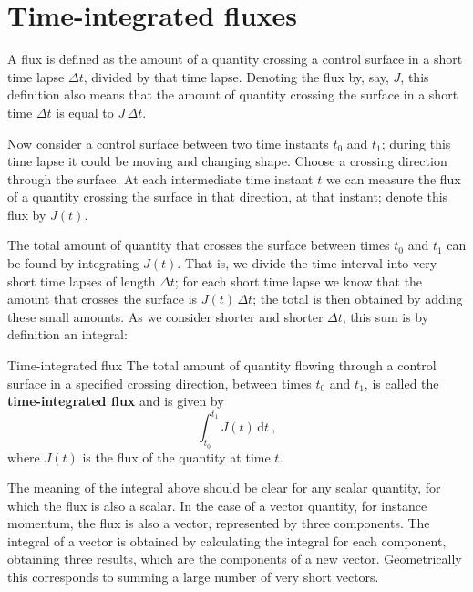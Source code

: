 \documentclass[a4paper,12pt,%
onecolumn,oneside,%
british%
]{memoir}
\newcommand*{\di}{\mathrm{d}}%
\newcommand*{\incr}{\Delta}%
\renewcommand*{\|}[1][]{\nonscript\:#1\vert\nonscript\:\mathopen{}}
\newcommand*{\yti}{t_{0}}
\newcommand*{\ytf}{t_{1}}
\newcommand*{\dt}{\di t}
\newcommand*{\Dt}{\incr t}
\newcommand*{\yJ}{J}
\begin{document}
%
%


\section{Time-integrated fluxes}
\label{sec:total_flow}

A flux is defined as the amount of a quantity crossing a control surface in a short time lapse $\Dt$, divided by that time lapse. Denoting the flux by, say, $\yJ$, this definition also means that the amount of quantity crossing the surface in a short time $\Dt$ is equal to $\yJ\,\Dt$.

Now consider a control surface between two time instants $\yti$ and $\ytf$; during this time lapse it could be moving and changing shape. Choose a crossing direction through the surface. At each intermediate time instant $t$ we can measure the flux of a quantity crossing the surface in that direction, at that instant; denote this flux by $\yJ(t)$.

The total amount of quantity that crosses the surface between times $\yti$ and $\ytf$ can be found by integrating $\yJ(t)$. That is, we divide the time interval into very short time lapses of length $\Dt$; for each short time lapse we know that the amount that crosses the surface is $\yJ(t)\,\Dt$; the total is then obtained by adding these small amounts. As we consider shorter and shorter $\Dt$, this sum is by definition an integral:
\begin{definition}{Time-integrated flux}
The total amount of quantity flowing through a control surface in a specified crossing direction, between times $\yti$ and $\ytf$, is called the \textbf{time-integrated flux} and is given by
  \begin{equation}
    \label{eq:total_flow_integral}
     \int_{\yti}^{\ytf}\!\! \yJ(t)\,\dt\ ,
   \end{equation}
   where $\yJ(t)$ is the flux of the quantity at time $t$.
\end{definition}

The meaning of the integral above should be clear for any scalar quantity, for which the flux is also a scalar. In the case of a vector quantity, for instance momentum, the flux is also a vector, represented by three components. The integral of a vector is obtained by calculating the integral for each component, obtaining three results, which are the components of a new vector. Geometrically this corresponds to summing a large number of very short vectors.
\end{document}
